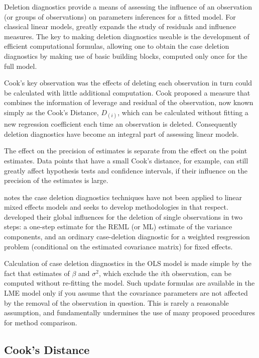 \documentclass[12pt, a4paper]{report}
\theoremstyle{definition}
\theoremstyle{remark}
\begin{document}
Deletion diagnostics provide a means of assessing the influence of an observation (or groups of observations) on parameters inferences for a fitted model. For classical linear models, \citet{cook77} greatly expands the study of residuals and influence measures. The key to making deletion diagnostics useable is the development of efficient computational formulas, allowing one to obtain the  case deletion diagnostics by making use of basic building blocks, computed only once for the full model.


Cook's key observation was the effects of deleting each observation in turn could be calculated with little additional computation. Cook proposed a measure that combines the information of leverage and residual of the observation, now known simply as the Cook's Distance, $D_{(i)}$, which can be calculated without fitting a new regression coefficient each time an observation is deleted. Consequently deletion diagnostics have become an integral part of assessing linear models.

The effect on the precision of estimates is separate from the effect on the point estimates. Data points that have a small Cook's distance, for example, can still greatly affect hypothesis tests and confidence intervals, if their influence on the precision of the estimates is large.


\citet{Christensen} notes the case deletion diagnostics techniques have not been applied to linear mixed effects models and seeks to develop methodologies in that respect. \citet{Christensen} developed their global influences for the deletion of single observations in two steps: a one-step estimate for the REML (or ML) estimate of the variance components, and an ordinary case-deletion diagnostic for a weighted resgression problem (conditional on the estimated covariance matrix) for fixed effects.


Calculation of case deletion diagnostics in the OLS model is made simple by the fact that estimates of $\beta$ and $\sigma^2$, which exclude the $i$th observation, can be computed without re-fitting the model. Such update formulas are available in the LME model only if you assume that the covariance parameters are not affected by the removal of the observation in question. This is rarely a reasonable assumption, and fundamentally undermines the use of many proposed procedures for method comparison.



\subsection{Cook's Distance}
\end{document}
